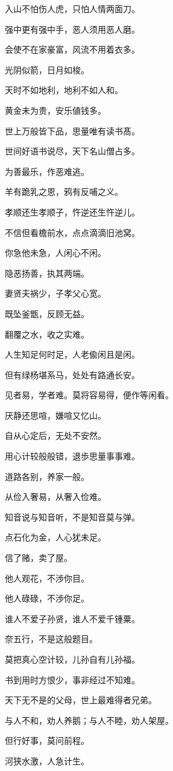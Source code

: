 \documentclass[12pt,oneside]{book}
\begin{document}
入山不怕伤人虎，只怕人情两面刀。

强中更有强中手，恶人须用恶人磨。

会使不在家豪富，风流不用着衣多。

光阴似箭，日月如梭。

天时不如地利，地利不如人和。

黄金未为贵，安乐値钱多。

世上万般皆下品，思量唯有读书髙。

世间好语书说尽，天下名山僧占多。

为善最乐，作恶难逃。

羊有跪乳之恩，鸦有反哺之义。

孝顺还生孝顺子，忤逆还生忤逆儿。

不信但看檐前水，点点滴滴旧池窝。

你急他未急，人闲心不闲。

隐恶扬善，执其两端。

妻贤夫祸少，子孝父心宽。

既坠釜甑，反顾无益。

翻覆之水，收之实难。

人生知足何时足，人老偸闲且是闲。

但有绿杨堪系马，处处有路通长安。

见者易，学者难。莫将容易得，便作等闲看。

厌静还思喧，嫌喧又忆山。

自从心定后，无处不安然。

用心计较般般错，退歩思量事事难。

道路各别，养家一般。

从俭入奢易，从奢入俭难。

知音说与知音听，不是知音莫与弹。

点石化为金，人心犹未足。

信了赌，卖了屋。

他人观花，不渉你目。

他人碌碌，不渉你足。

谁人不爱子孙贤，谁人不爱千锺粟。

奈五行，不是这般题目。

莫把真心空计较，儿孙自有儿孙福。

书到用时方恨少，事非经过不知难。

天下无不是的父母，世上最难得者兄弟。

与人不和，劝人养鹅；与人不睦，劝人架屋。

但行好事，莫问前程。

河狭水激，人急计生。
\end{document}
